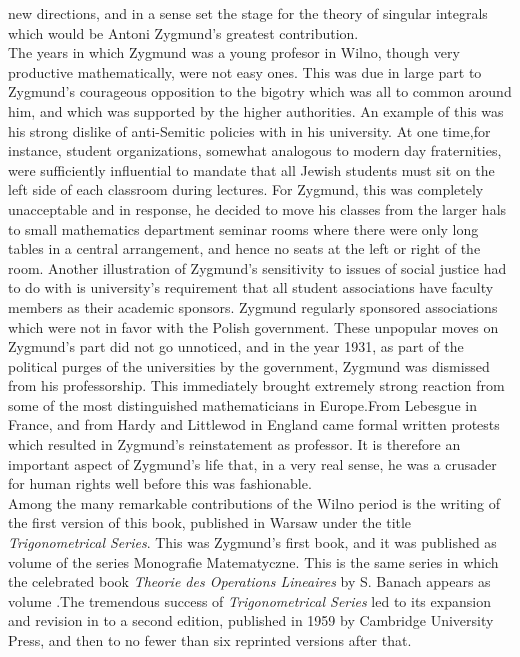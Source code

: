 new directions, and in a sense set the stage for the theory of singular integrals which would be Antoni Zygmund's 
greatest contribution.\\
\indent The years in which Zygmund was a young profesor in Wilno, though very productive mathematically, 
were not easy ones. This was due in large part to Zygmund's courageous opposition to the bigotry which was 
all to common around him, and which was supported by the higher authorities. An example of this was his 
strong dislike of anti-Semitic policies with in his university. At one time,for instance, student organizations, 
somewhat analogous to modern day fraternities, were sufficiently influential to mandate that all Jewish 
students must sit on the left side of each classroom during lectures. For Zygmund, this was completely unacceptable 
and in response, he decided to move his classes from the larger hals to small mathematics department seminar rooms 
where there were only long tables in a central arrangement, and hence no seats at the left or right of the 
room. Another illustration of Zygmund's sensitivity to issues of social justice had to do with is university's 
requirement that all student associations have faculty members as their academic sponsors. Zygmund 
regularly sponsored associations which were not in favor with the Polish government. These unpopular moves on 
Zygmund's part did not go unnoticed, and in the year 1931, as part of the political purges of the universities by 
the government, Zygmund was dismissed from his professorship. This immediately brought extremely strong reaction 
from some of the most distinguished mathematicians in Europe.From Lebesgue in France, and  from Hardy and 
Littlewod in England came formal written protests which resulted in Zygmund's reinstatement as professor. 
It is therefore an important aspect of Zygmund's life that, in a very real sense, he was a crusader for human 
rights well before this was fashionable.\\
\indent Among the many remarkable contributions of the Wilno period is the writing of the first version of 
this book, published in Warsaw under the title \textit{Trigonometrical Series}. This was Zygmund's first book, 
and it was published as volume  of the series Monografie Matematyczne. This is the same series in which the 
celebrated book \textit{Theorie des Operations Lineaires} by S. Banach appears as volume .The tremendous success 
of \textit{Trigonometrical Series} led to its expansion and revision in to a second edition, published in 1959 
by Cambridge University Press, and then to no fewer than six reprinted versions after that.\\
